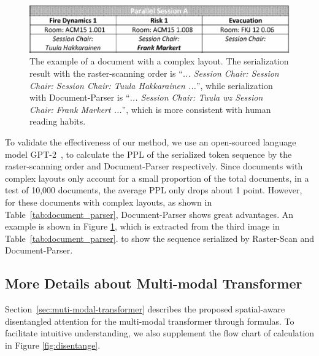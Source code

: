 \documentclass[11pt]{article}
\begin{document}
\begin{figure}[t]
    \includegraphics[width=\linewidth]{figures/document_parser/parser_case_7.png}
    \caption{The example of a document with a complex layout. The serialization result with the raster-scanning order is ``\emph{... Session Chair: Session Chair: Session Chair: Tuula Hakkarainen ...}'', while serialization with Document-Parser is ``\emph{... Session Chair: Tuula wz Session Chair: Frank Markert ...}'', which is more consistent with human reading habits.}
    \label{fig:table_case}
\end{figure}


To validate the effectiveness of our method, we use an open-sourced language model GPT-2~\cite{radford2019language}, to calculate the PPL of the serialized token sequence by the raster-scanning order and Document-Parser respectively. Since documents with complex layouts only account for a small proportion of the total documents, in a test of 10,000 documents, the average PPL only drops about 1 point. However, for these documents with complex layouts, as shown in Table~\ref{tab:document_parser}, Document-Parser shows great advantages.
An example is shown in Figure \ref{fig:table_case}, which is extracted from the third image in Table~\ref{tab:document_parser}. to show the sequence serialized by Raster-Scan and Document-Parser. 




\subsection{More Details about Multi-modal Transformer}
\label{sec:detail_disentangle}
Section~\ref{sec:muti-modal-transformer} describes the proposed spatial-aware disentangled attention for the multi-modal transformer through formulas.
To facilitate intuitive understanding, we also supplement the flow chart of calculation in Figure \ref{fig:disentange}.
\end{document}
